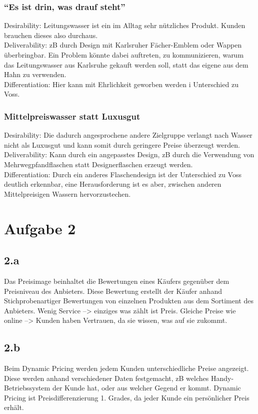 \documentclass{article}
\begin{document}
\subsubsection{"`Es ist drin, was drauf steht"'}
Desirability: Leitungswasser ist ein im Alltag sehr nützliches Produkt. Kunden brauchen dieses also durchaus. \\
Deliverability: zB durch Design mit Karlsruher Fächer-Emblem oder Wappen überbringbar. Ein Problem könnte dabei auftreten, zu kommunizieren, warum das Leitungswasser aus Karlsruhe gekauft werden soll, statt das eigene aus dem Hahn zu verwenden.\\
Differentiation: Hier kann mit Ehrlichkeit geworben werden i Unterschied zu Voss.\\

\subsubsection{Mittelpreiswasser statt Luxusgut}
Desirability: Die dadurch angesprochene andere Zielgruppe verlangt nach Wasser nicht als Luxusgut und kann somit durch geringere Preise überzeugt werden.\\
Deliverability: Kann durch ein angepasstes Design, zB durch die Verwendung von Mehrwegpfandflaschen statt Designerflaschen erzeugt werden.\\
Differentiation: Durch ein anderes Flaschendesign ist der Unterschied zu Voss deutlich erkennbar, eine Herausforderung ist es aber, zwischen anderen Mittelpreisigen Wassern hervorzustechen.\\

\section{Aufgabe 2}
\subsection{2.a}
Das Preisimage beinhaltet die Bewertungen eines Käufers gegenüber dem Preisniveau des Anbieters. Diese Bewertung erstellt der Käufer anhand Stichprobenartiger Bewertungen von einzelnen Produkten aus dem Sortiment des Anbieters.
Wenig Service --> einziges was zählt ist Preis.
Gleiche Preise wie online --> Kunden haben Vertrauen, da sie wissen, was auf sie zukommt.

\subsection{2.b}
Beim Dynamic Pricing werden jedem Kunden unterschiedliche Preise angezeigt. Diese werden anhand verschiedener Daten festgemacht, zB welches Handy-Betriebssystem der Kunde hat, oder aus welcher Gegend er kommt. Dynamic Pricing ist Preisdifferenzierung 1. Grades, da jeder Kunde ein persönlicher Preis erhält.
\end{document}
